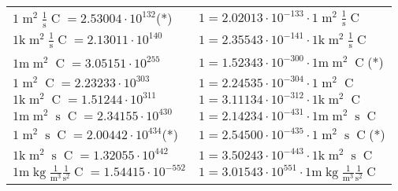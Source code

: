 \begin{center}
\begin{longtable}{l l}
{\color{black}$1 \bm{\mathrm{ }}{\operatorname{m}^2}\frac1{\operatorname{s}}{\operatorname{C}}{} = 2.53004\cdot10^{132} $}\quad(*) & {\color{black}$ 1 = 2.02013\cdot10^{-133} \cdot 1 \bm{\mathrm{ }}{\operatorname{m}^2}\frac1{\operatorname{s}}{\operatorname{C}}{}$}  \\
{\color{gray}$1 \bm{\mathrm{ k}}{\operatorname{m}^2}\frac1{\operatorname{s}}{\operatorname{C}}{} = 2.13011\cdot10^{140} $}   & {\color{gray}$ 1 = 2.35543\cdot10^{-141} \cdot 1 \bm{\mathrm{ k}}{\operatorname{m}^2}\frac1{\operatorname{s}}{\operatorname{C}}{}$}  \\
{\color{gray}$1 \bm{\mathrm{ m}}{\operatorname{m}^2}{}{\operatorname{C}}{} = 3.05151\cdot10^{255} $}   & {\color{gray}$ 1 = 1.52343\cdot10^{-300} \cdot 1 \bm{\mathrm{ m}}{\operatorname{m}^2}{}{\operatorname{C}}{}$}\quad(*)\\
{\color{black}$1 \bm{\mathrm{ }}{\operatorname{m}^2}{}{\operatorname{C}}{} = 2.23233\cdot10^{303} $}   & {\color{black}$ 1 = 2.24535\cdot10^{-304} \cdot 1 \bm{\mathrm{ }}{\operatorname{m}^2}{}{\operatorname{C}}{}$}  \\
{\color{gray}$1 \bm{\mathrm{ k}}{\operatorname{m}^2}{}{\operatorname{C}}{} = 1.51244\cdot10^{311} $}   & {\color{gray}$ 1 = 3.11134\cdot10^{-312} \cdot 1 \bm{\mathrm{ k}}{\operatorname{m}^2}{}{\operatorname{C}}{}$}  \\
{\color{gray}$1 \bm{\mathrm{ m}}{\operatorname{m}^2}{\operatorname{s}}{\operatorname{C}}{} = 2.34155\cdot10^{430} $}   & {\color{gray}$ 1 = 2.14234\cdot10^{-431} \cdot 1 \bm{\mathrm{ m}}{\operatorname{m}^2}{\operatorname{s}}{\operatorname{C}}{}$}  \\
{\color{black}$1 \bm{\mathrm{ }}{\operatorname{m}^2}{\operatorname{s}}{\operatorname{C}}{} = 2.00442\cdot10^{434} $}\quad(*) & {\color{black}$ 1 = 2.54500\cdot10^{-435} \cdot 1 \bm{\mathrm{ }}{\operatorname{m}^2}{\operatorname{s}}{\operatorname{C}}{}$}\quad(*)\\
{\color{gray}$1 \bm{\mathrm{ k}}{\operatorname{m}^2}{\operatorname{s}}{\operatorname{C}}{} = 1.32055\cdot10^{442} $}   & {\color{gray}$ 1 = 3.50243\cdot10^{-443} \cdot 1 \bm{\mathrm{ k}}{\operatorname{m}^2}{\operatorname{s}}{\operatorname{C}}{}$}  \\
\hline{\color{gray}$1 \bm{\mathrm{ m}}\operatorname{kg}\frac1{\operatorname{m}^3}\frac1{\operatorname{s}^2}{\operatorname{C}}{} = 1.54415\cdot10^{-552} $}   & {\color{gray}$ 1 = 3.01543\cdot10^{551} \cdot 1 \bm{\mathrm{ m}}\operatorname{kg}\frac1{\operatorname{m}^3}\frac1{\operatorname{s}^2}{\operatorname{C}}{}$}  \\

\end{longtable}
\end{center}
